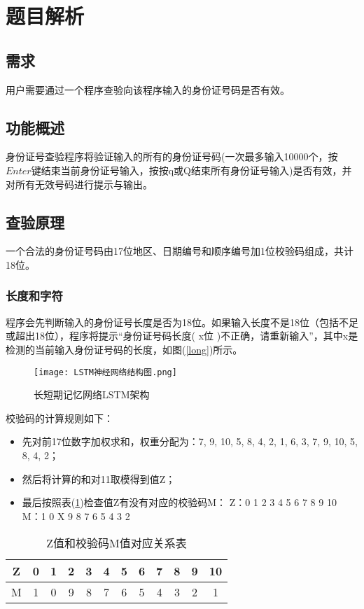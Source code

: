\documentclass[withoutpreface,bwprint]{cumcmthesis}  %
\title{\heiti{\zihao{3}身份证号查验程序设计文档}}
\begin{document}
	
	\tableofcontents
	\maketitle

	
	\section{题目解析}%
	\subsection{需求}
	用户需要通过一个程序查验向该程序输入的身份证号码是否有效。
	\subsection{功能概述} 
	身份证号查验程序将验证输入的所有的身份证号码(一次最多输入10000个，按$Enter$键结束当前身份证号输入，按按q或Q结束所有身份证号输入)是否有效，并对所有无效号码进行提示与输出。
	
	\subsection{查验原理}
	一个合法的身份证号码由17位地区、日期编号和顺序编号加1位校验码组成，共计18位。
	\subsubsection{长度和字符}
	程序会先判断输入的身份证号长度是否为18位。如果输入长度不是18位（包括不足或超出18位），程序将提示“身份证号码长度( x位 )不正确，请重新输入”，其中x是检测的当前输入身份证号码的长度，如图(\ref{long})所示。
	\begin{figure}[ht]
		\centering
		\texttt{[image: LSTM神经网络结构图.png]}
		\caption{长短期记忆网络LSTM架构}
		\label{LSTM}
	\end{figure}
	校验码的计算规则如下：
	\begin{itemize}
		\item 先对前17位数字加权求和，权重分配为：{7, 9, 10, 5, 8, 4, 2, 1, 6, 3, 
			7, 9, 10, 5, 8, 4, 2}；
		\item 然后将计算的和对11取模得到值Z；
		\item 最后按照表(\ref{Z-M})检查值Z有没有对应的校验码M：
		Z：0 1 2 3 4 5 6 7 8 9 10
		M：1 0 X 9 8 7 6 5 4 3 2
	\end{itemize}
	
	\begin{table}[h] 
		\centering
		\caption{Z值和校验码M值对应关系表} 
		\begin{tabular}{cccccccccccc}  
			\toprule  
			Z & 0 & 1 & 2 & 3 & 4 & 5 & 6 & 7 & 8 & 9 & 10 \\  
			\midrule  
			M & 1 & 0 & 9 & 8 & 7 & 6 & 5 & 4 & 3 & 2 & 1  \\  
			\bottomrule  
		\end{tabular}
		\label{Z-M}  
		
	\end{table}  
\end{document}
